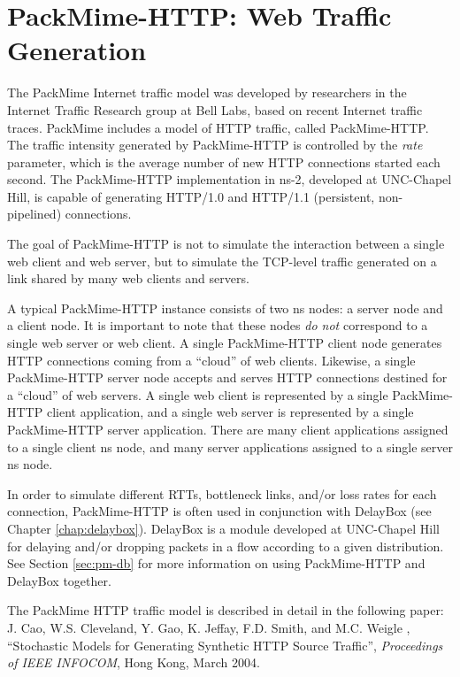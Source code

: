 \chapter{PackMime-HTTP: Web Traffic Generation}
\label{chap:packmime}

The PackMime Internet traffic model was developed by researchers in
the Internet Traffic Research group at Bell Labs, based on recent
Internet traffic traces.  PackMime includes a model of HTTP traffic,
called PackMime-HTTP. The traffic intensity generated by PackMime-HTTP
is controlled by the \emph{rate} parameter, which is the average number of
new HTTP connections started each second. The PackMime-HTTP implementation
in ns-2, developed at UNC-Chapel Hill, is capable of generating
HTTP/1.0 and HTTP/1.1 (persistent, non-pipelined) connections.

The goal of PackMime-HTTP is not to simulate the interaction between
a single web client and web server, but to simulate the TCP-level
traffic generated on a link shared by many web clients and servers.

A typical PackMime-HTTP instance consists of two ns nodes: a server
node and a client node.  It is important to note that these nodes \emph{do
not} correspond to a single web server or web client.  A single
PackMime-HTTP client node generates HTTP connections coming from a
``cloud'' of web clients.  Likewise, a single PackMime-HTTP server
node accepts and serves HTTP connections destined for a ``cloud'' of
web servers.  A single web client is represented by a single PackMime-HTTP
client application, and a single web server is represented by a single
PackMime-HTTP server application.  There are many client applications
assigned to a single client ns node, and many server applications
assigned to a single server ns node.

In order to simulate different RTTs, bottleneck links, and/or loss
rates for each connection, PackMime-HTTP is often used in conjunction
with DelayBox (see Chapter \ref{chap:delaybox}).  DelayBox is a module
developed at UNC-Chapel Hill for delaying and/or dropping packets in a
flow according to a given distribution.  See Section \ref{sec:pm-db} for
more information on using PackMime-HTTP and DelayBox together.

The PackMime HTTP traffic model is described in detail in the following paper:
J. Cao, W.S. Cleveland, Y. Gao, K. Jeffay, F.D. Smith, and M.C. Weigle
, ``Stochastic Models for Generating Synthetic HTTP Source Traffic'',
\emph{Proceedings of IEEE INFOCOM}, Hong Kong, March 2004.

